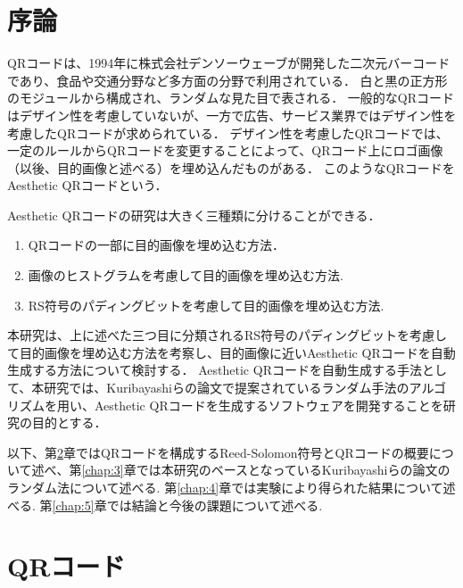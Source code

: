 \documentclass{thesis}
\begin{document}
\tableofcontents

\chapter{序論}

QRコード\cite{QR}は、1994年に株式会社デンソーウェーブが開発した二次元バーコード であり、食品や交通分野など多方面の分野で利用されている．
白と黒の正方形のモジュールから構成され、ランダムな見た目で表される．
一般的なQRコードはデザイン性を考慮していないが、一方で広告、サービス業界ではデザイン性を考慮したQRコードが求められている．
デザイン性を考慮したQRコードでは、一定のルールからQRコードを変更することによって、QRコード上にロゴ画像（以後、目的画像と述べる）を埋め込んだものがある．
このようなQRコードをAesthetic QRコード\cite{KURI}という．

Aesthetic QRコードの研究は大きく三種類に分けることができる．

\begin{enumerate}
\item
QRコードの一部に目的画像を埋め込む方法．
\item
画像のヒストグラムを考慮して目的画像を埋め込む方法\cite{hist}.
\item
RS符号のパディングビットを考慮して目的画像を埋め込む方法\cite{KURI}.
\end{enumerate}

本研究は、上に述べた三つ目に分類されるRS符号のパディングビットを考慮して目的画像を埋め込む方法を考察し、目的画像に近いAesthetic QRコードを自動生成する方法について検討する．
Aesthetic QRコードを自動生成する手法として、本研究では、Kuribayashiらの論文\cite{KURI}で提案されているランダム手法のアルゴリズムを用い、Aesthetic QRコードを生成するソフトウェアを開発することを研究の目的とする．

以下、第\ref{chap:2}章ではQRコードを構成するReed-Solomon符号とQRコードの概要について述べ、第\ref{chap:3}章では本研究のベースとなっているKuribayashiらの論文\cite{KURI}のランダム法について述べる.
第\ref{chap:4}章では実験により得られた結果について述べる.
第\ref{chap:5}章では結論と今後の課題について述べる.


\chapter{QRコード}
\label{chap:2}
\end{document}
